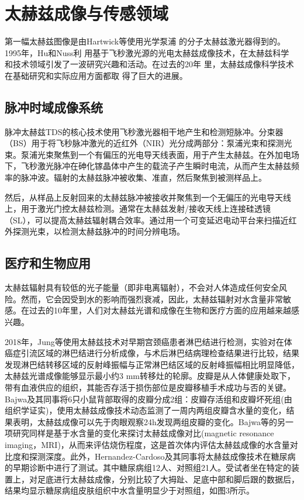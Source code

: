 \section{太赫兹成像与传感领域}

第一幅太赫兹图像是由Hartwick等使用光学泵浦
的分子太赫兹激光器得到的。1995年，Hu和Nuss利
用基于飞秒激光源的光电太赫兹成像技术，在太赫兹科学
和技术领域引发了一波研究兴趣和活动。在过去的20年
里，太赫兹成像科学技术在基础研究和实际应用方面都取
得了巨大的进展。

\subsection{脉冲时域成像系统}

脉冲太赫兹TDS的核心技术使用飞秒激光器相干地产生和检测短脉冲。分束器（BS）用于将飞秒脉冲激光的近红外（NIR）光分成两部分：泵浦光束和探测光束。泵浦光束聚焦到一个有偏压的光电导天线表面，用于产生太赫兹。在外加电场下，飞秒激光脉冲在砷化镓晶体中产生的载流子产生瞬时电流，从而产生太赫兹频率的脉冲波。辐射的太赫兹脉冲被收集、准直，然后聚焦到被测样品上\cite{8702204}。

然后，从样品上反射回来的太赫兹脉冲被接收并聚焦到一个无偏压的光电导天线上，用于激光门控太赫兹检测。通常在太赫兹发射/接收天线上连接硅透镜（SL），可以提高太赫兹辐射耦合效率。通过用一个可变延迟电动平台来扫描近红外探测光束，以检测太赫兹脉冲的时间分辨电场。

\subsection{医疗和生物应用}

太赫兹辐射具有较低的光子能量（即非电离辐射），不会对人体造成任何安全风险。然而，它会因受到水的影响而强烈衰减，因此，太赫兹辐射对水含量非常敏感。在过去的10年里，人们对太赫兹光谱和成像在生物和医疗方面的应用越来越感兴趣。

2018年，Jung等使用太赫兹技术对早期宫颈癌患者淋巴结进行检测，实验对在体癌症引流区域的淋巴结进行分析成像，与术后淋巴结病理检查结果进行比较，结果发现淋巴结转移区域的反射峰振幅与正常淋巴结区域的反射峰振幅相比明显降低，太赫兹光谱成像能够显示最小约3 mm转移灶的轮廓。皮瓣是从人体健康处取下，带有血液供应的组织，其能否存活于损伤部位是皮瓣移植手术成功与否的关键。Bajwa及其同事将6只小鼠背部取得的皮瓣分成2组：皮瓣存活组和皮瓣坏死组(由组织学证实)，使用太赫兹成像技术动态监测了一周内两组皮瓣含水量的变化，结果表明，太赫兹成像可以先于肉眼观察24h发现两组皮瓣的变化。Bajwa等的另一项研究同样是基于水含量的变化来探讨太赫兹成像对比(magnetic resonance imaging，MRI)，从而来评估烧伤程度，这是首次体内评估太赫兹成像的水含量对比度和探测深度。此外，Hernandez-Cardoso及其同事将太赫兹成像技术在糖尿病的早期诊断中进行了测试。其中糖尿病组12人、对照组21人。受试者坐在特定的装置上，对足底进行太赫兹成像，分别比较了大拇趾、足底中部和脚后跟的数据后，结果均显示糖尿病组皮肤组织中水含量明显少于对照组，如图3所示。

